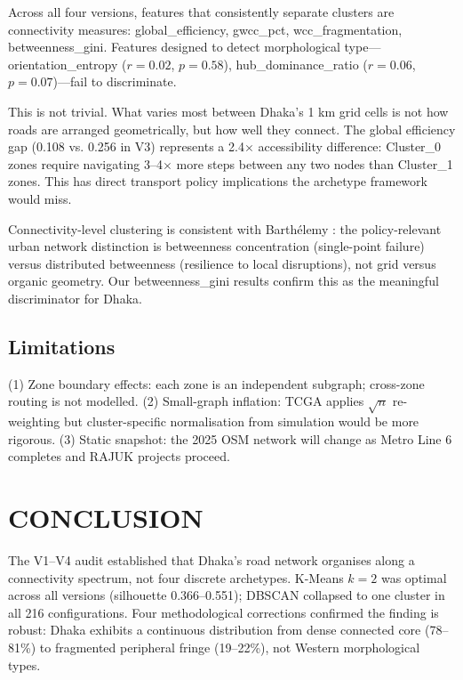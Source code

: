 \documentclass[sigconf, nonacm]{acmart}
\begin{document}
Across all four versions, features that consistently separate clusters are connectivity measures: global\_\allowbreak efficiency, gwcc\_\allowbreak pct, wcc\_\allowbreak fragmentation, betweenness\_\allowbreak gini. Features designed to detect morphological type—orientation\_\allowbreak entropy ($r = 0.02$, $p = 0.58$), hub\_\allowbreak dominance\_\allowbreak ratio ($r = 0.06$, $p = 0.07$)—fail to discriminate.

This is not trivial. What varies most between Dhaka's 1 km grid cells is not how roads are arranged geometrically, but how well they connect. The global efficiency gap (0.108 vs. 0.256 in V3) represents a 2.4$\times$ accessibility difference: Cluster\_0 zones require navigating 3--4$\times$ more steps between any two nodes than Cluster\_1 zones. This has direct transport policy implications the archetype framework would miss.

Connectivity-level clustering is consistent with Barthélemy \cite{barthelemy2011}: the policy-relevant urban network distinction is betweenness concentration (single-point failure) versus distributed betweenness (resilience to local disruptions), not grid versus organic geometry. Our betweenness\_gini results confirm this as the meaningful discriminator for Dhaka.

\subsection{Limitations}

(1) Zone boundary effects: each zone is an independent subgraph; cross-zone routing is not modelled. (2) Small-graph inflation: TCGA applies $\sqrt{n}$ re-weighting but cluster-specific normalisation from simulation would be more rigorous. (3) Static snapshot: the 2025 OSM network will change as Metro Line 6 completes and RAJUK projects proceed.

\section{CONCLUSION}

The V1--V4 audit established that Dhaka's road network organises along a connectivity spectrum, not four discrete archetypes. K-Means $k = 2$ was optimal across all versions (silhouette 0.366--0.551); DBSCAN collapsed to one cluster in all 216 configurations. Four methodological corrections confirmed the finding is robust: Dhaka exhibits a continuous distribution from dense connected core (78--81\%) to fragmented peripheral fringe (19--22\%), not Western morphological types.
\end{document}
